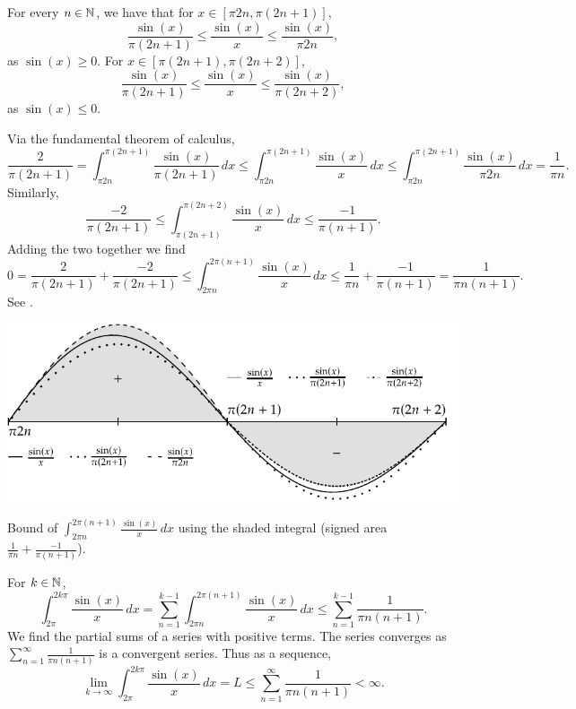 \begin{example}
For every $n \in {\mathbb{N}}$, we have that for $x \in [\pi 2n, \pi (2n+1)]$,
\begin{equation*}
\frac{\sin(x)}{\pi (2n+1)}
\leq
\frac{\sin(x)}{x}
\leq
\frac{\sin(x)}{\pi 2n} ,
\end{equation*}
as $\sin(x) \geq 0$.  For $x \in [\pi (2n+1), \pi (2n+2)]$,
\begin{equation*}
\frac{\sin(x)}{\pi (2n+1)}
\leq
\frac{\sin(x)}{x}
\leq
\frac{\sin(x)}{\pi (2n+2)} ,
\end{equation*}
as $\sin(x) \leq 0$.

Via the fundamental theorem of calculus,
\begin{equation*}
\frac{2}{\pi (2n+1)}
=
\int_{\pi 2n}^{\pi (2n+1)}
\frac{\sin(x)}{\pi (2n+1)}
\,dx
\leq
\int_{\pi 2n}^{\pi (2n+1)}
\frac{\sin(x)}{x}
\,dx
\leq
\int_{\pi 2n}^{\pi (2n+1)}
\frac{\sin(x)}{\pi 2n}
\,dx
=
\frac{1}{\pi n} .
\end{equation*}
Similarly,
\begin{equation*}
\frac{-2}{\pi (2n+1)}
\leq
\int_{\pi (2n+1)}^{\pi (2n+2)}
\frac{\sin(x)}{x}
\,dx
\leq
\frac{-1}{\pi (n+1)} .
\end{equation*}
Adding the two together we find
\begin{equation*}
0
=
\frac{2}{\pi (2n+1)}
+
\frac{-2}{\pi (2n+1)}
\leq
\int_{2\pi n}^{2\pi (n+1)}
\frac{\sin(x)}{x}
\,dx
\leq
\frac{1}{\pi n} 
+
\frac{-1}{\pi (n+1)} 
=
\frac{1}{\pi n(n+1)} .
\end{equation*}
See .
\begin{myfigureht}
\includegraphics{figures/sincbound}
\caption{Bound of $\int_{2\pi n}^{2\pi (n+1)} \frac{\sin(x)}{x} \,dx$ using
the shaded integral (signed area
$\frac{1}{\pi n} 
+
\frac{-1}{\pi (n+1)}$).\label{fig:sincbound}}
\end{myfigureht}

For $k \in {\mathbb{N}}$, 
\begin{equation*}
\int_{2\pi}^{2k\pi} \frac{\sin(x)}{x} \,dx
=
\sum_{n=1}^{k-1}
\int_{2\pi n}^{2\pi (n+1)} \frac{\sin(x)}{x} \,dx 
\leq
\sum_{n=1}^{k-1}
\frac{1}{\pi n(n+1)} .
\end{equation*}
We find the partial sums of a series with positive terms.
The series
converges as
$\sum_{n=1}^\infty \frac{1}{\pi n (n+1)}$ is a convergent series.  Thus
as a sequence,
\begin{equation*}
\lim_{k\to \infty} \int_{2\pi}^{2k\pi} \frac{\sin(x)}{x} \,dx
=L \leq
\sum_{n=1}^{\infty}
\frac{1}{\pi n(n+1)} < \infty .
\end{equation*}


\end{example}
